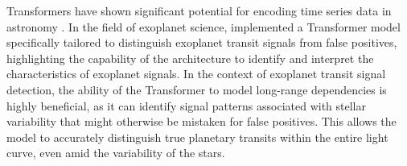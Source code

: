 \fi



Transformers have shown significant potential for encoding time series data in astronomy \citep[e.g.][]{allam2021paying, zerveas2021transformer, morvan2022don}. In the field of exoplanet science, \cite{10.1093/mnras/stad1173} implemented a Transformer model specifically tailored to distinguish exoplanet transit signals from false positives, highlighting the capability of the architecture to identify and interpret the characteristics of exoplanet signals. In the context of exoplanet transit signal detection, the ability of the Transformer to model long-range dependencies is highly beneficial, as it can identify signal patterns associated with stellar variability that might otherwise be mistaken for false positives. This allows the model to accurately distinguish true planetary transits within the entire light curve, even amid the variability of the stars.  \par

